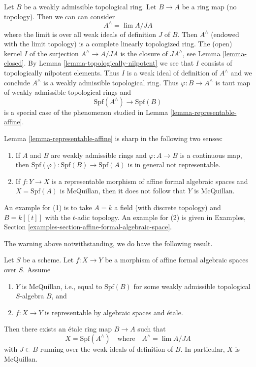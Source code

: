 \begin{example}
\label{example-representable-morphism-from-completion}
Let $B$ be a weakly admissible topological ring. Let $B \to A$ be
a ring map (no topology). Then we can can consider
$$
A^\wedge = \lim A/JA
$$
where the limit is over all weak ideals of definition $J$ of $B$.
Then $A^\wedge$ (endowed with the limit topology) is a
complete linearly topologized ring. The (open) kernel $I$
of the surjection $A^\wedge \to A/JA$ is the closure of $JA^\wedge$, see
Lemma \ref{lemma-closed}. By
Lemma \ref{lemma-topologically-nilpotent}
we see that $I$ consists of topologically nilpotent elements.
Thus $I$ is a weak ideal of definition of $A^\wedge$ and we conclude
$A^\wedge$ is a weakly admissible topological ring. Thus
$\varphi : B \to A^\wedge$ is taut map of weakly admissible
topological rings and
$$
\text{Spf}(A^\wedge) \longrightarrow \text{Spf}(B)
$$
is a special case of the phenomenon studied in
Lemma \ref{lemma-representable-affine}.
\end{example}

\begin{remark}[Warning]
\label{remark-warning}
Lemma \ref{lemma-representable-affine} is sharp in the following
two senses:
\begin{enumerate}
\item If $A$ and $B$ are weakly admissible rings and $\varphi : A \to B$
is a continuous map, then
$\text{Spf}(\varphi) : \text{Spf}(B) \to \text{Spf}(A)$ is in general
not representable.
\item If $f : Y \to X$ is a representable morphism of affine
formal algebraic spaces and $X = \text{Spf}(A)$ is McQuillan,
then it does not follow that $Y$ is McQuillan.
\end{enumerate}
An example for (1) is to take $A = k$ a field (with discrete topology)
and $B = k[[t]]$ with the $t$-adic topology.
An example for (2) is given in
Examples, Section \ref{examples-section-affine-formal-algebraic-space}.
\end{remark}

\noindent
The warning above notwithstanding, we do have the following result.

\begin{lemma}
\label{lemma-etale}
Let $S$ be a scheme. Let $f : X \to Y$ be a morphism of affine formal
algebraic spaces over $S$. Assume
\begin{enumerate}
\item $Y$ is McQuillan, i.e., equal to $\text{Spf}(B)$ for some
weakly admissible topological $S$-algebra $B$, and
\item $f : X \to Y$ is representable by algebraic spaces and \'etale.
\end{enumerate}
Then there exists an \'etale ring map $B \to A$ such that
$$
X = \text{Spf}(A^\wedge)
\quad\text{where}\quad
A^\wedge = \lim A/JA
$$
with $J \subset B$ running over the weak ideals of definition of $B$.
In particular, $X$ is McQuillan.
\end{lemma}

